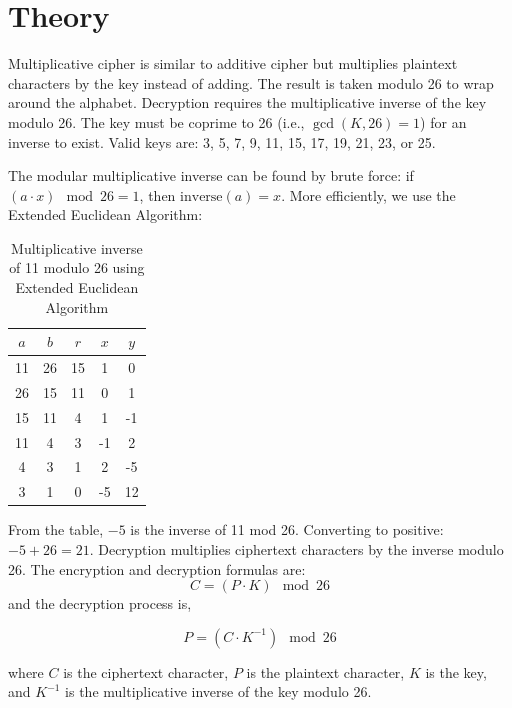 
\section{Theory}
Multiplicative cipher is similar to additive cipher but multiplies plaintext characters by the key instead of adding. The result is taken modulo 26 to wrap around the alphabet. Decryption requires the multiplicative inverse of the key modulo 26. The key must be coprime to 26 (i.e., $\gcd(K, 26) = 1$) for an inverse to exist. Valid keys are: 3, 5, 7, 9, 11, 15, 17, 19, 21, 23, or 25.

The modular multiplicative inverse can be found by brute force: if $(a \cdot x) \mod 26 = 1$, then $\text{inverse}(a) = x$. More efficiently, we use the Extended Euclidean Algorithm:

\begin{table}[H]
  \centering
  \begin{tabular}{|c|c|c|c|c|}
    \hline
    $a$ & $b$ & $r$ & $x$ & $y$ \\
    \hline
    11 & 26 & 15 & 1 & 0 \\
    26 & 15 & 11 & 0 & 1 \\
    15 & 11 & 4 & 1 & -1 \\
    11 & 4 & 3 & -1 & 2 \\
    4 & 3 & 1 & 2 & -5 \\
    3 & 1 & 0 & -5 & 12 \\
    \hline
  \end{tabular}
  \caption{Multiplicative inverse of 11 modulo 26 using Extended Euclidean Algorithm}
\end{table}

From the table, $-5$ is the inverse of 11 mod 26. Converting to positive: $-5 + 26 = 21$. Decryption multiplies ciphertext characters by the inverse modulo 26. The encryption and decryption formulas are:
$$C = (P \cdot K) \mod 26$$
and the decryption process is,

$$P = (C \cdot K^{-1}) \mod 26$$

where $C$ is the ciphertext character, $P$ is the plaintext character, $K$ is the key, and $K^{-1}$ is the multiplicative inverse of the key modulo 26.



